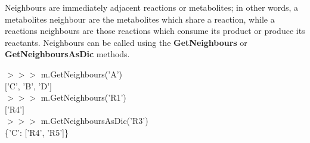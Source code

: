 Neighbours are immediately adjacent reactions or metabolites; in other words, a metabolites neighbour are the metabolites which share a reaction, while a reactions neighbours are those reactions which consume its product or produce its reactants. Neighbours can be called using the \textbf{GetNeighbours} or \textbf{GetNeighboursAsDic} methods.

\begin{framed}
$>>>$ m.GetNeighbours('A')\\
$[$'C', 'B', 'D'$]$\\

$>>>$ m.GetNeighbours('R1')\\
$[$'R4'$]$\\

$>>>$ m.GetNeighboursAsDic('R3')\\
\{'C': ['R4', 'R5']\}
\end{framed}



